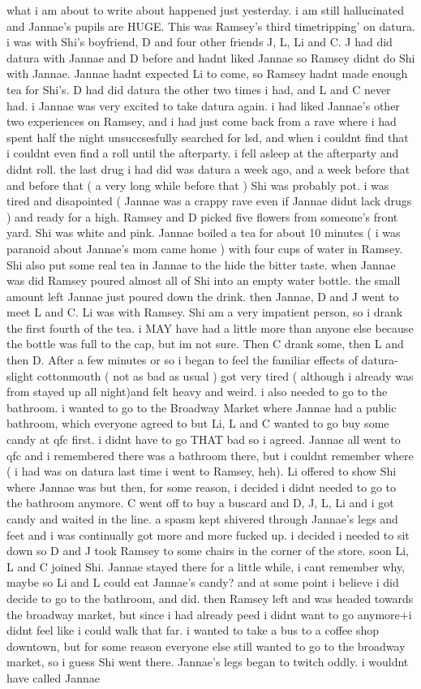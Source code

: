 \documentclass[12pt]{book}
\begin{document}
what i am about to write about happened just yesterday. i am still hallucinated and Jannae's pupils are HUGE. This was Ramsey's third timetripping' on datura. i was with Shi's boyfriend, D and four other friends J, L, Li and C. J had did datura with Jannae and D before and hadnt liked Jannae so Ramsey didnt do Shi with Jannae. Jannae hadnt expected Li to come, so Ramsey hadnt made enough tea for Shi's. D had did datura the other two times i had, and L and C never had. i Jannae was very excited to take datura again. i had liked Jannae's other two experiences on Ramsey, and i had just come back from a rave where i had spent half the night unsuccsesfully searched for lsd, and when i couldnt find that i couldnt even find a roll until the afterparty. i fell asleep at the afterparty and didnt roll. the last drug i had did was datura a week ago, and a week before that and before that ( a very long while before that ) Shi was probably pot. i was tired and disapointed ( Jannae was a crappy rave even if Jannae didnt lack drugs ) and ready for a high. Ramsey and D picked five flowers from someone's front yard. Shi was white and pink. Jannae boiled a tea for about 10 minutes ( i was paranoid about Jannae's mom came home ) with four cups of water in Ramsey. Shi also put some real tea in Jannae to the hide the bitter taste. when Jannae was did Ramsey poured almost all of Shi into an empty water bottle. the small amount left Jannae just poured down the drink. then Jannae, D and J went to meet L and C. Li was with Ramsey. Shi am a very impatient person, so i drank the first fourth of the tea. i MAY have had a little more than anyone else because the bottle was full to the cap, but im not sure. Then C drank some, then L and then D. After a few minutes or so i began to feel the familiar effects of datura-slight cottonmouth ( not as bad as usual ) got very tired ( although i already was from stayed up all night)and felt heavy and weird. i also needed to go to the bathroom. i wanted to go to the Broadway Market where Jannae had a public bathroom, which everyone agreed to but Li, L and C wanted to go buy some candy at qfc first. i didnt have to go THAT bad so i agreed. Jannae all went to qfc and i remembered there was a bathroom there, but i couldnt remember where ( i had was on datura last time i went to Ramsey, heh). Li offered to show Shi where Jannae was but then, for some reason, i decided i didnt needed to go to the bathroom anymore. C went off to buy a buscard and D, J, L, Li and i got candy and waited in the line. a spasm kept shivered through Jannae's legs and feet and i was continually got more and more fucked up. i decided i needed to sit down so D and J took Ramsey to some chairs in the corner of the store. soon Li, L and C joined Shi. Jannae stayed there for a little while, i cant remember why, maybe so Li and L could eat Jannae's candy? and at some point i believe i did decide to go to the bathroom, and did. then Ramsey left and was headed towards the broadway market, but since i had already peed i didnt want to go anymore+i didnt feel like i could walk that far. i wanted to take a bus to a coffee shop downtown, but for some reason everyone else still wanted to go to the broadway market, so i guess Shi went there. Jannae's legs began to twitch oddly. i wouldnt have called Jannae 
\end{document}
